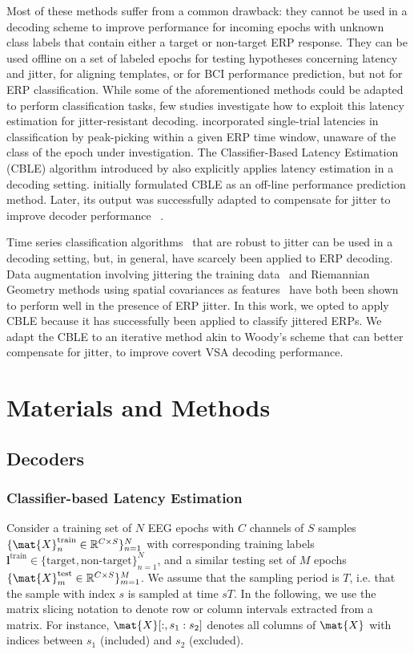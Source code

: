 Most of these methods suffer from a common drawback: they cannot be used in a
decoding scheme to improve performance for incoming epochs with unknown
class labels that contain either a target or non-target ERP response.
They can be used offline on a set of labeled epochs for testing hypotheses
concerning latency and jitter, for aligning templates, or for BCI performance
prediction, but not for ERP classification.
While some of the aforementioned methods could be adapted to perform
classification tasks, few studies investigate how to exploit this latency estimation
for jitter-resistant decoding.
\cite{hardiansyah2020single} incorporated single-trial latencies in
classification by peak-picking within a given
ERP time window, unaware of the class of the epoch under investigation.
The Classifier-Based Latency Estimation (CBLE) algorithm introduced
by \cite{Thompson2012} also explicitly applies latency estimation in a
decoding setting.
\cite{Thompson2012} initially formulated CBLE as an off-line performance prediction method.
Later, its output was successfully adapted to compensate for jitter to improve decoder performance%
~\cite{Mowla2017,Zisk2022}.

Time series classification algorithms~\cite{Abanda2019}
that are robust to jitter can be used in a decoding setting,
but, in general, have scarcely been applied to ERP decoding.
Data augmentation involving jittering the training
data~\cite{Krell2018,Zisk2022} and Riemannian Geometry methods using spatial
covariances as features~\cite{Aydarkhanov2020} have both been shown
to perform well in the presence of ERP jitter.
In this work, we opted to apply CBLE because it has successfully been applied to
classify jittered ERPs.
We adapt the CBLE to an iterative method akin to Woody's scheme that can better
compensate for jitter, to improve covert VSA decoding performance.

\section{Materials and Methods}
\subsection{Decoders}
\subsubsection{Classifier-based Latency Estimation}
\label{sec:cble}

Consider a training set of $N$ EEG epochs with $C$ channels of $S$
samples $\{\mat{X}_n^\mathrm{train} \in \mathbb{R}^{C\times S}\}_{n=1}^N$
with corresponding training labels $\mathbf{l^\mathrm{train}} \in \{\mathrm{target},
	\textrm{non-target}\}_{n=1}^N$, and a
similar testing set of $M$ epochs $\{\mat{X}_m^\mathrm{test} \in
	\mathbb{R}^{C\times S}\}_{m=1}^M$.
We assume that the sampling period is $T$, i.e. that the sample with index $s$ is sampled at time $sT$.
In the following, we use the matrix slicing notation to denote row or column intervals extracted from a matrix.
For instance, $\mat{X}[:,s_1:s_2]$ denotes all columns of $\mat{X}$ with indices between $s_1$ (included) and $s_2$ (excluded).

